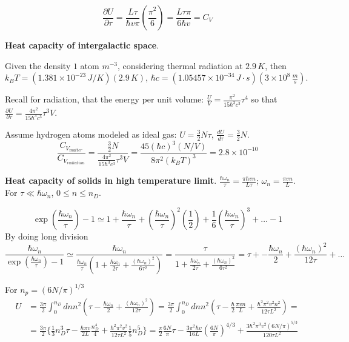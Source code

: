 \[
\frac{\partial U}{\partial \tau} = \frac{L\tau}{ \hbar v\pi} \left( \frac{\pi^2 }{6} \right) = \boxed{ \frac{ L\tau \pi}{6\hbar v} = C_V }
\]








 \textbf{Heat capacity of intergalactic space}.  

Given the density $1$ atom $m^{-3}$, considering thermal radiation at $2.9 \, K$, then $k_B T = (1.381 \times 10^{-23} \, J/K)(2.9 \, K)$, $\hbar c = (1.05457 \times 10^{-34} \, J\cdot s)(3\times 10^8 \, \frac{m}{s} )$.  

Recall for radiation, that the energy per unit volume: $\frac{U}{V} = \frac{\pi^2 }{ 15 \hbar^3 c^3 } \tau^4$ so that  $\frac{\partial U}{\partial \tau} = \frac{4\pi^2 }{15 \hbar^3 c^3 } \tau^3 V$.  

Assume hydrogen atoms modeled as ideal gas: $U = \frac{3}{2} N \tau$, $\frac{dU}{d\tau} = \frac{3}{2} N$.  
\[
\frac{C_{V_{matter}} }{ C_{V_{radiation}} } = \frac{ \frac{3}{2} N }{ \frac{4\pi^2 }{ 15 \hbar^3 c^3 } \tau^3 V } = \frac{ 45 (\hbar c)^3 (N/V) }{ 8 \pi^2 (k_B T)^3 } = 2.8 \times 10^{-10}
\]



 \textbf{Heat capacity of solids in high temperature limit}.  $ \frac{\hbar \omega_n }{\tau} = \frac{\pi \hbar v n}{L\tau}$; $ \omega_n = \frac{\pi  v n}{L}$.  For $\tau \ll \hbar \omega_n$, $ 0 \leq n \leq n_D$.  

\[
\exp{ \left( \frac{\hbar \omega_n}{\tau} \right)} - 1 \simeq 1 + \frac{\hbar \omega_n}{\tau} + \left( \frac{\hbar \omega_n }{ \tau} \right)^2 \left( \frac{1}{2} \right) + \frac{1}{6} \left( \frac{\hbar \omega_n}{\tau} \right)^3  + \dots - 1 
\]
By doing long division
\[
\frac{\hbar \omega_n }{ \exp{ \left( \frac{\hbar \omega_n }{\tau} \right) - 1} }  \simeq  \frac{\hbar \omega_n }{ \frac{\hbar \omega_n }{ \tau} \left( 1 + \frac{\hbar \omega_n }{ 2 \tau } + \frac{ (\hbar \omega_n)^2 }{ 6 \tau^2  } \right) } = \frac{ \tau }{ 1 + \frac{\hbar \omega_n }{ 2 \tau } + \frac{ (\hbar \omega_n)^2 }{ 6 \tau^2  } } = \tau + -\frac{\hbar \omega_n}{2} + \frac{ (\hbar \omega_n)^2 }{ 12 \tau} + \dots
\]

For $n_p = (6N/\pi)^{1/3}$
\[
\begin{aligned}
  U & = \frac{3\pi}{2} \int_0^{n_D} dn n^2 ( \tau - \frac{\hbar \omega_n}{2} + \frac{ (\hbar \omega_n)^2 }{12 \tau } ) = \frac{3\pi}{2} \int_0^{n_D} dn n^2 ( \tau - \frac{\hbar }{2} \frac{\pi v n }{L} + \frac{\hbar^2 \pi^2 v^2 n^2 }{ 12 \tau L^2 } ) = \\
  & = \frac{3\pi}{2} \lbrace \frac{1}{3} n_D^3 \tau - \frac{\hbar \pi v}{2L} \frac{n_D^4 }{4} + \frac{ \hbar^2 \pi^2 v^2 }{ 12 \tau L^2 } \frac{1}{5} n_D^5 \rbrace   = \frac{\pi}{2} \frac{6N }{\pi} \tau - \frac{ 3 \pi^2 \hbar v}{ 16 L} \left( \frac{6 N}{\pi} \right)^{4/3} + \frac{3\hbar^2 \pi^3 v^2 (6N /\pi)^{5/3} }{ 120 \tau L^2 }
\end{aligned}
\]


